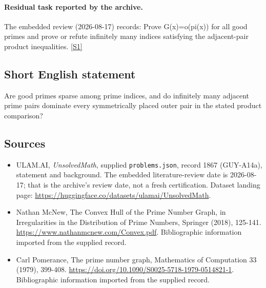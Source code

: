 \documentclass[11pt,a4paper]{article}
\newcommand{\sref}[2]{\hyperlink{source:#1:#2}{[S#2]}}
\begin{document}
\paragraph{Residual task reported by the archive.}

The embedded review (2026-08-17) records: Prove G(x)=o(pi(x)) for all good primes and prove or refute infinitely many indices satisfying the adjacent-pair product inequalities. \sref{1867}{1}

\subsection{Short English statement}

Are good primes sparse among prime indices, and do infinitely many adjacent prime pairs dominate every symmetrically placed outer pair in the stated product comparison?

\subsection{Sources}

{\small

\begin{itemize}

\item[\hypertarget{source:1867:1}{S1}] ULAM.AI, \emph{UnsolvedMath}, supplied \texttt{problems.json}, record 1867 (GUY-A14a), statement and background. The embedded literature-review date is 2026-08-17; that is the archive’s review date, not a fresh certification. Dataset landing page: \url{https://huggingface.co/datasets/ulamai/UnsolvedMath}.

\item[\hypertarget{source:1867:2}{S2}] Nathan McNew, The Convex Hull of the Prime Number Graph, in Irregularities in the Distribution of Prime Numbers, Springer (2018), 125-141. \url{https://www.nathanmcnew.com/Convex.pdf}. Bibliographic information imported from the supplied record.

\item[\hypertarget{source:1867:3}{S3}] Carl Pomerance, The prime number graph, Mathematics of Computation 33 (1979), 399-408. \url{https://doi.org/10.1090/S0025-5718-1979-0514821-1}. Bibliographic information imported from the supplied record.

\end{itemize}

}

\label{end:1867}
\end{document}
